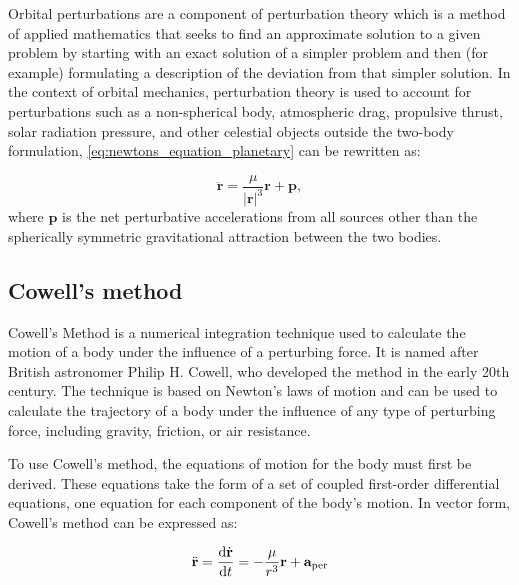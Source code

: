 Orbital perturbations are a component of perturbation theory which is a method of applied mathematics that seeks to find an approximate solution to a given problem by starting with an exact solution of a simpler problem and then (for example) formulating a description of the deviation from that simpler solution. In the context of orbital mechanics, perturbation theory is used to account for perturbations such as a non-spherical body, atmospheric drag, propulsive thrust, solar radiation pressure, and other celestial objects outside the two-body formulation, \autoref{eq:newtons_equation_planetary} can be rewritten as:

\begin{equation}
    \ddot{\mathbf{r}}=\frac{\mu}{|\mathbf{r}|^3}\mathbf{r}+\mathbf{p},
    \label{eq:newtons_equation_planetary_with_p}
\end{equation}
where $\mathbf{p}$ is the net perturbative accelerations from all sources other than the spherically symmetric gravitational attraction between the two bodies.

\subsection{Cowell's method}

Cowell's Method is a numerical integration technique used to calculate the motion of a body under the influence of a perturbing force. It is named after British astronomer Philip H. Cowell, who developed the method in the early 20th century. The technique is based on Newton's laws of motion and can be used to calculate the trajectory of a body under the influence of any type of perturbing force, including gravity, friction, or air resistance.

To use Cowell's method, the equations of motion for the body must first be derived. These equations take the form of a set of coupled first-order differential equations, one equation for each component of the body's motion. In vector form, Cowell's method can be expressed as:

\begin{equation}
    \begin{aligned}
        \ddot{\mathbf{r}}=\dv{\dot{\mathbf{r}}}{t}=-\frac{\mu}{r^3}\mathbf{r} + \mathbf{a}_{\mathrm{per}}
    \end{aligned}
\end{equation}

